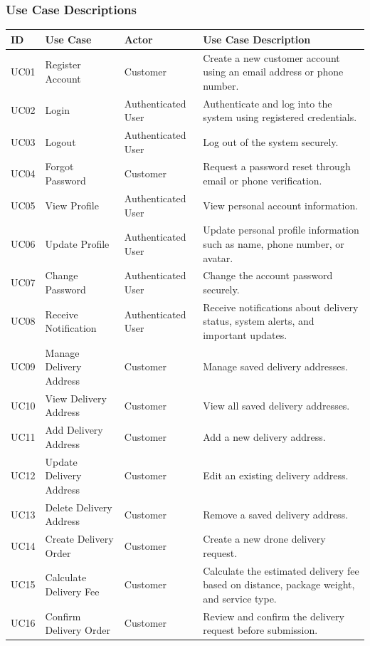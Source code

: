 \subsubsection{Use Case Descriptions}

\begin{longtable}{@{}p{1.3cm}p{3cm}p{2.7cm}p{6.5cm}@{}}
\toprule
\textbf{ID} & \textbf{Use Case} & \textbf{Actor} & \textbf{Use Case Description} \\
\midrule
\endhead
UC01 & Register Account & Customer & Create a new customer account using an email address or phone number. \\
UC02 & Login & Authenticated User & Authenticate and log into the system using registered credentials. \\
UC03 & Logout & Authenticated User & Log out of the system securely. \\
UC04 & Forgot Password & Customer & Request a password reset through email or phone verification. \\
UC05 & View Profile & Authenticated User & View personal account information. \\
UC06 & Update Profile & Authenticated User & Update personal profile information such as name, phone number, or avatar. \\
UC07 & Change Password & Authenticated User & Change the account password securely. \\
UC08 & Receive Notification & Authenticated User & Receive notifications about delivery status, system alerts, and important updates. \\
UC09 & Manage Delivery Address & Customer & Manage saved delivery addresses. \\
UC10 & View Delivery Address & Customer & View all saved delivery addresses. \\
UC11 & Add Delivery Address & Customer & Add a new delivery address. \\
UC12 & Update Delivery Address & Customer & Edit an existing delivery address. \\
UC13 & Delete Delivery Address & Customer & Remove a saved delivery address. \\
UC14 & Create Delivery Order & Customer & Create a new drone delivery request. \\
UC15 & Calculate Delivery Fee & Customer & Calculate the estimated delivery fee based on distance, package weight, and service type. \\
UC16 & Confirm Delivery Order & Customer & Review and confirm the delivery request before submission. \\

\end{longtable}
